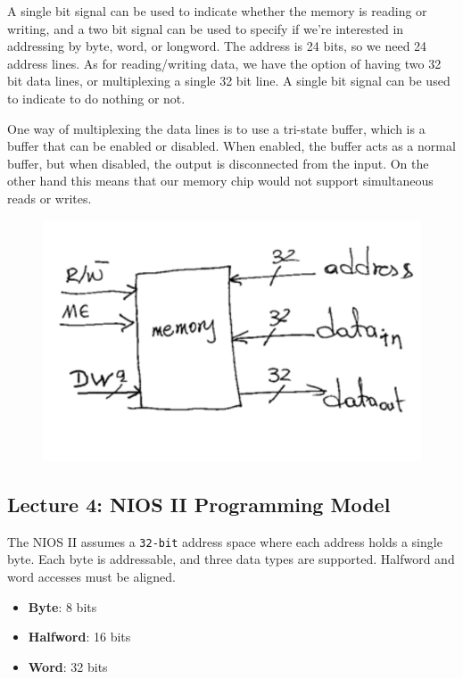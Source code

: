 \documentclass[../notes.tex]{subfiles}
\begin{document}
A single bit signal can be used to indicate whether the memory is reading or writing, and a two bit signal can be used to specify if we're interested in addressing by byte, word, or longword.
The address is 24 bits, so we need 24 address lines.
As for reading/writing data, we have the option of having two 32 bit data lines, or multiplexing a single 32 bit line.
A single bit signal can be used to indicate to do nothing or not. 

One way of multiplexing the data lines is to use a tri-state buffer, which is a buffer that can be enabled or disabled.
When enabled, the buffer acts as a normal buffer, but when disabled, the output is disconnected from the input.
On the other hand this means that our memory chip would not support simultaneous reads or writes.




\begin{figure}[H]
	\centering
	\includegraphics[width=0.8\linewidth]{img/image_2022-09-16-02-18-16.png}
\end{figure}

\subsection{Lecture 4: NIOS II Programming Model}

The NIOS II assumes a \texttt{32-bit} address space where each address holds a single byte.
Each byte is addressable, and three data types are supported. Halfword and word accesses must be aligned.

\begin{itemize}
	\item \textbf{Byte}: 8 bits
	\item \textbf{Halfword}: 16 bits
	\item \textbf{Word}: 32 bits
\end{itemize}
\end{document}
